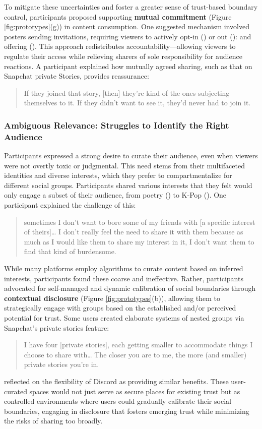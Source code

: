 To mitigate these uncertainties and foster a greater sense of trust-based boundary control, participants proposed supporting \textbf{mutual commitment} (Figure \ref{fig:prototypes}(g)) in content consumption. One suggested mechanism involved posters sending invitations, requiring viewers to actively opt-in () or out ():  and offering  (). This approach redistributes accountability---allowing viewers to regulate their access while relieving sharers of sole responsibility for audience reactions. A participant explained how mutually agreed sharing, such as that on Snapchat private Stories, provides reassurance: 
\blockquote{If they joined that story, [then] they're kind of the ones subjecting themselves to it. If they didn't want to see it, they'd never had to join it.}{}



\subsubsection{Ambiguous Relevance: Struggles to Identify the Right Audience}
\label{section:4-2-3}
Participants expressed a strong desire to curate their audience, even when viewers were not overtly toxic or judgmental. This need stems from their multifaceted identities and diverse interests, which they prefer to compartmentalize for different social groups. Participants shared various interests that they felt would only engage a subset of their audience, from poetry () to K-Pop (). One participant explained the challenge of this:
\blockquote{sometimes I don't want to bore some of my friends with [a specific interest of theirs]\ldots{} I don't really feel the need to share it with them because as much as I would like them to share my interest in it, I don't want them to find that kind of burdensome.}{} 

While many platforms employ algorithms to curate content based on inferred interests, participants found these coarse and ineffective. Rather, participants advocated for self-managed and dynamic calibration of social boundaries through \textbf{contextual disclosure} (Figure \ref{fig:prototypes}(b)), allowing them to strategically engage with groups based on the established and/or perceived potential for trust. Some users created elaborate systems of nested groups via Snapchat's private stories feature: 
\blockquote{I have four [private stories], each getting smaller to accommodate things I choose to share with\ldots{} The closer you are to me, the more (and smaller) private stories you're in.}{} 
 reflected on the flexibility of Discord as providing similar benefits. 
These user-curated spaces would not just serve as secure places for existing trust but as controlled environments where users could gradually calibrate their social boundaries, engaging in disclosure that fosters emerging trust while minimizing the risks of sharing too broadly.


